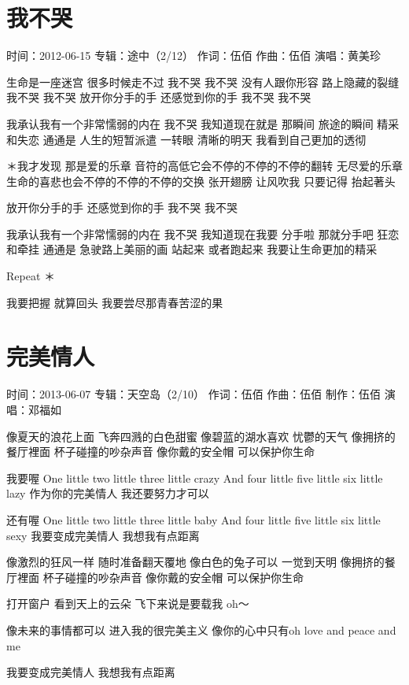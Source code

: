 \documentclass[UTF8,a4paper,oneside,twocolumn,12pt]{ctexbook}
\newcommand{\infopair}[2]{\textbullet #1：#2}
\newcommand{\zc}[1][伍佰]{\infopair{作词}{#1}}
\newcommand{\zq}[1][伍佰]{\infopair{作曲}{#1}}
\newcommand{\zj}[1]{\infopair{专辑}{#1}}
\newcommand{\zz}[1]{\infopair{制作}{#1}}
\newcommand{\sj}[1]{\infopair{时间}{#1}}
\newenvironment{info}{\begin{flushleft}\kaishu
	}
	{\end{flushleft}\normalsize\yahei\par}
\newenvironment{lyric}{
	}
{}
\begin{document}
\section{我不哭}
\begin{info}
	\sj{2012-06-15}
	\zj{途中（2/12）}
	\zc
	\zq
	\infopair{演唱}{黄美珍}
\end{info}
\begin{lyric}
	生命是一座迷宫 很多时候走不过
	我不哭 我不哭
	没有人跟你形容 路上隐藏的裂缝
	我不哭 我不哭
	放开你分手的手 还感觉到你的手
	我不哭 我不哭

	我承认我有一个非常懦弱的内在
	我不哭 我知道现在就是
	那瞬间 旅途的瞬间
	精采和失恋 通通是
	人生的短暂派遣
	一转眼 清晰的明天
	我看到自己更加的透彻

	＊我才发现 那是爱的乐章
	音符的高低它会不停的不停的不停的翻转
	无尽爱的乐章
	生命的喜悲也会不停的不停的不停的交换
	张开翅膀 让风吹我
	只要记得 抬起著头

	放开你分手的手
	还感觉到你的手
	我不哭 我不哭

	我承认我有一个非常懦弱的内在
	我不哭 我知道现在我要
	分手啦 那就分手吧
	狂恋和牵挂 通通是
	急驶路上美丽的画
	站起来 或者跑起来
	我要让生命更加的精采

	Repeat ＊

	我要把握 就算回头
	我要尝尽那青春苦涩的果
\end{lyric}

\section{完美情人}
\begin{info}
	\sj{2013-06-07}
	\zj{天空岛（2/10）}
	\zc
	\zq
	\zz{伍佰}
	\infopair{演唱}{邓福如}
\end{info}
\begin{lyric}
	像夏天的浪花上面 飞奔四溅的白色甜蜜
	像碧蓝的湖水喜欢 忧鬱的天气
	像拥挤的餐厅裡面 杯子碰撞的吵杂声音
	像你戴的安全帽 可以保护你生命

	我要喔 One little two little three
	little crazy And four little five
	little six little lazy
	作为你的完美情人 我还要努力才可以

	还有喔 One little two little three
	little baby And four little five
	little six little sexy
	我要变成完美情人 我想我有点距离

	像激烈的狂风一样 随时准备翻天覆地
	像白色的兔子可以 一觉到天明
	像拥挤的餐厅裡面 杯子碰撞的吵杂声音
	像你戴的安全帽 可以保护你生命

	打开窗户 看到天上的云朵
	飞下来说是要载我 oh～

	像未来的事情都可以 进入我的很完美主义
	像你的心中只有oh love and peace and me

	我要变成完美情人 我想我有点距离
\end{lyric}
\end{document}
